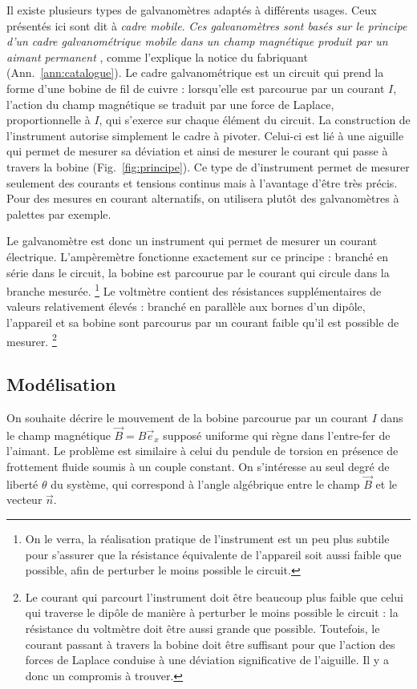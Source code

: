 \documentclass[12pt,a4paper,fleqn]{article}
\begin{document}
Il existe plusieurs types de galvanomètres adaptés à différents usages.
Ceux présentés ici sont dit à \emph{cadre mobile}.
\og \emph{Ces galvanomètres sont basés sur le principe d'un cadre galvanométrique mobile dans un champ magnétique produit par un aimant permanent} \fg{}, comme l'explique la notice du fabriquant (Ann.~\ref{ann:catalogue}).
Le cadre galvanométrique est un circuit qui prend la forme d'une bobine de fil de cuivre : lorsqu'elle est parcourue par un courant $I$, l'action du champ magnétique se traduit par une force de Laplace, proportionnelle à $I$, qui s'exerce sur chaque élément du circuit.
La construction de l'instrument autorise simplement le cadre à pivoter.
Celui-ci est lié à une aiguille qui permet de mesurer sa déviation et ainsi de mesurer le courant qui passe à travers la bobine (Fig.~\ref{fig:principe}).
Ce type de d'instrument permet de mesurer seulement des courants et tensions continus mais à l'avantage d'être très précis.
Pour des mesures en courant alternatifs, on utilisera plutôt des galvanomètres à palettes par exemple.

Le galvanomètre est donc un instrument qui permet de mesurer un courant électrique.
L'ampèremètre fonctionne exactement sur ce principe : branché en série dans le circuit, la bobine est parcourue par le courant qui circule dans la branche mesurée.
\footnote{On le verra, la réalisation pratique de l'instrument est un peu plus subtile pour s'assurer que la résistance équivalente de l'appareil soit aussi faible que possible, afin de perturber le moins possible le circuit.} 
Le voltmètre contient des résistances supplémentaires de valeurs relativement élevés : branché en parallèle aux bornes d'un dipôle, l'appareil et sa bobine sont parcourus par un courant faible qu'il est possible de mesurer.
\footnote{Le courant qui parcourt l'instrument doit être beaucoup plus faible que celui qui traverse le dipôle de manière à perturber le moins possible le circuit : la résistance du voltmètre doit être aussi grande que possible.
Toutefois, le courant passant à travers la bobine doit être suffisant pour que l'action des forces de Laplace conduise à une déviation significative de l'aiguille.
Il y a donc un compromis à trouver.}

\subsection{Modélisation}

On souhaite décrire le mouvement de la bobine parcourue par un courant $I$ dans le champ magnétique $\vec{B}=B\vec{e}_x$ supposé uniforme qui règne dans l'entre-fer de l'aimant.
Le problème est similaire à celui du pendule de torsion en présence de frottement fluide soumis à un couple constant.
On s'intéresse au seul degré de liberté $\theta$ du système, qui correspond à l'angle algébrique entre le champ $\vec{B}$ et le vecteur $\vec{n}$.
\end{document}
